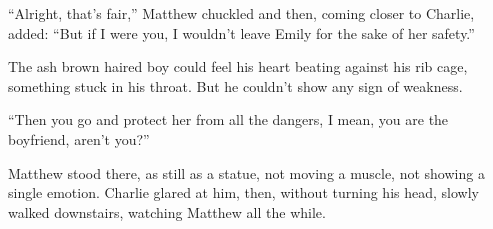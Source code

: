 “Alright, that's fair,” Matthew chuckled and then, coming closer to Charlie, added: “But if I were you, I wouldn't leave Emily for the sake of her safety.”

The ash brown haired boy could feel his heart beating against his rib cage, something stuck in his throat. But he couldn't show any sign of weakness.

“Then you go and protect her from all the dangers, I mean, you are the boyfriend, aren't you?”

Matthew stood there, as still as a statue, not moving a muscle, not showing a single emotion. Charlie glared at him, then, without turning his head, slowly walked downstairs, watching Matthew all the while.